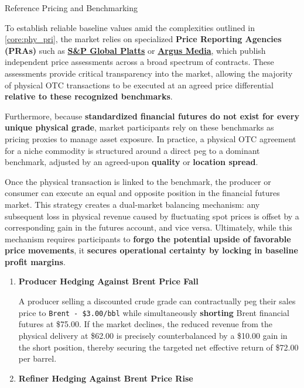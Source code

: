 \documentclass[10pt]{article}
\begin{document}
    \begin{core}{Reference Pricing and Benchmarking}

      To establish reliable baseline values amid the complexities outlined in \autoref{core:phy_pri}, the market relies on specialized \textbf{Price Reporting Agencies (PRAs)} such as \href{https://www.spglobal.com/energy/en}{\textbf{S\&P Global Platts}} or \href{https://www.argusmedia.com/en}{\textbf{Argus Media}}, which publish independent price assessments across a broad spectrum of contracts. These assessments provide critical transparency into the market, allowing the majority of physical OTC transactions to be executed at an agreed price differential \textbf{relative to these recognized benchmarks}.

      Furthermore, because \textbf{standardized financial futures do not exist for every unique physical grade}, market participants rely on these benchmarks as pricing proxies to manage asset exposure. In practice, a physical OTC agreement for a niche commodity is structured around a direct peg to a dominant benchmark, adjusted by an agreed-upon \textbf{quality} or \textbf{location spread}.

      Once the physical transaction is linked to the benchmark, the producer or consumer can execute an equal and opposite position in the financial futures market. This strategy creates a dual-market balancing mechanism: any subsequent loss in physical revenue caused by fluctuating spot prices is offset by a corresponding gain in the futures account, and vice versa. Ultimately, while this mechanism requires participants to \textbf{forgo the potential upside of favorable price movements}, it \textbf{secures operational certainty by locking in baseline profit margins}.

      \begin{enumerate}

        \item \textbf{Producer Hedging Against Brent Price Fall}

        A producer selling a discounted crude grade can contractually peg their sales price to \texttt{Brent - \$3.00/bbl} while simultaneously \textbf{shorting} Brent financial futures at \$75.00. If the market declines, the reduced revenue from the physical delivery at \$62.00 is precisely counterbalanced by a \$10.00 gain in the short position, thereby securing the targeted net effective return of \$72.00 per barrel.

        \item \textbf{Refiner Hedging Against Brent Price Rise}


\end{enumerate}
\end{core}
\end{document}
